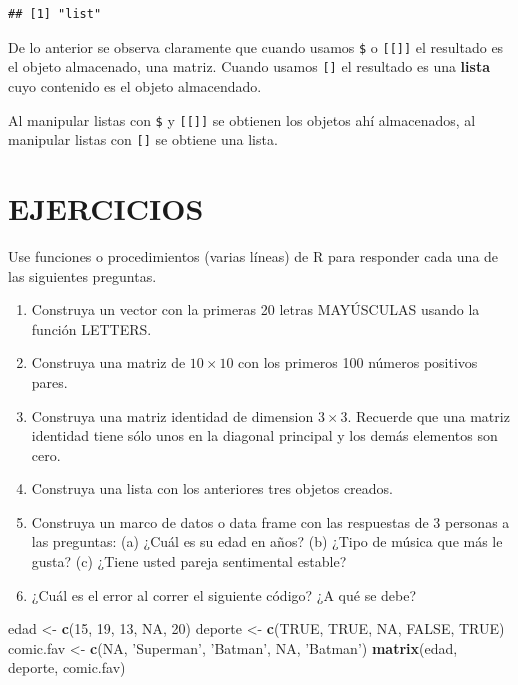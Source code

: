 \documentclass[10pt,]{krantz}
\makeatletter
\newenvironment{Shaded}{\begin{snugshade}}{\end{snugshade}}
\newcommand{\KeywordTok}[1]{\textcolor[rgb]{0.13,0.29,0.53}{\textbf{#1}}}
\newcommand{\DecValTok}[1]{\textcolor[rgb]{0.00,0.00,0.81}{#1}}
\newcommand{\StringTok}[1]{\textcolor[rgb]{0.31,0.60,0.02}{#1}}
\newcommand{\OtherTok}[1]{\textcolor[rgb]{0.56,0.35,0.01}{#1}}
\newcommand{\NormalTok}[1]{#1}
\let\proglang=\textsf
\newenvironment{kframe}{%
\medskip{}
\setlength{\fboxsep}{.8em}
 \def\at@end@of@kframe{}%
 \ifinner\ifhmode%
  \def\at@end@of@kframe{\end{minipage}}%
  \begin{minipage}{\columnwidth}%
 \fi\fi%
 \def\FrameCommand##1{\hskip\@totalleftmargin \hskip-\fboxsep
 \colorbox{shadecolor}{##1}\hskip-\fboxsep
     \hskip-\linewidth \hskip-\@totalleftmargin \hskip\columnwidth}%
 \MakeFramed {\advance\hsize-\width
   \@totalleftmargin\z@ \linewidth\hsize
   \@setminipage}}%
 {\par\unskip\endMakeFramed%
 \at@end@of@kframe}
\renewenvironment{Shaded}{\begin{kframe}}{\end{kframe}}
\let\BeginKnitrBlock\begin \let\EndKnitrBlock\end
\makeatother
\begin{document}
\begin{verbatim}
## [1] "list"
\end{verbatim}

De lo anterior se observa claramente que cuando usamos \texttt{\$} o
\texttt{{[}{[}{]}{]}} el resultado es el objeto almacenado, una matriz.
Cuando usamos \texttt{{[}{]}} el resultado es una \textbf{lista} cuyo
contenido es el objeto almacendado.

\BeginKnitrBlock{rmdwarning}
Al manipular listas con \texttt{\$} y \texttt{{[}{[}{]}{]}} se obtienen
los objetos ahí almacenados, al manipular listas con \texttt{{[}{]}} se
obtiene una lista.
\EndKnitrBlock{rmdwarning}

\section*{EJERCICIOS}\label{ejercicios}


Use funciones o procedimientos (varias líneas) de \proglang{R} para
responder cada una de las siguientes preguntas.

\begin{enumerate}
\def\labelenumi{\arabic{enumi}.}
\item
  Construya un vector con la primeras 20 letras MAYÚSCULAS usando la
  función LETTERS.
\item
  Construya una matriz de \(10 \times 10\) con los primeros 100 números
  positivos pares.
\item
  Construya una matriz identidad de dimension \(3 \times 3\). Recuerde
  que una matriz identidad tiene sólo unos en la diagonal principal y
  los demás elementos son cero.
\item
  Construya una lista con los anteriores tres objetos creados.
\item
  Construya un marco de datos o data frame con las respuestas de 3
  personas a las preguntas: (a) ¿Cuál es su edad en años? (b) ¿Tipo de
  música que más le gusta? (c) ¿Tiene usted pareja sentimental estable?
\item
  ¿Cuál es el error al correr el siguiente código? ¿A qué se debe?
\end{enumerate}

\begin{Shaded}
\begin{Highlighting}[]
\NormalTok{edad <-}\StringTok{ }\KeywordTok{c}\NormalTok{(}\DecValTok{15}\NormalTok{, }\DecValTok{19}\NormalTok{, }\DecValTok{13}\NormalTok{, }\OtherTok{NA}\NormalTok{, }\DecValTok{20}\NormalTok{)}
\NormalTok{deporte <-}\StringTok{ }\KeywordTok{c}\NormalTok{(}\OtherTok{TRUE}\NormalTok{, }\OtherTok{TRUE}\NormalTok{, }\OtherTok{NA}\NormalTok{, }\OtherTok{FALSE}\NormalTok{, }\OtherTok{TRUE}\NormalTok{)}
\NormalTok{comic.fav <-}\StringTok{ }\KeywordTok{c}\NormalTok{(}\OtherTok{NA}\NormalTok{, }\StringTok{'Superman'}\NormalTok{, }\StringTok{'Batman'}\NormalTok{, }\OtherTok{NA}\NormalTok{, }\StringTok{'Batman'}\NormalTok{)}
\KeywordTok{matrix}\NormalTok{(edad, deporte, comic.fav)}
\end{Highlighting}
\end{Shaded}
\end{document}
